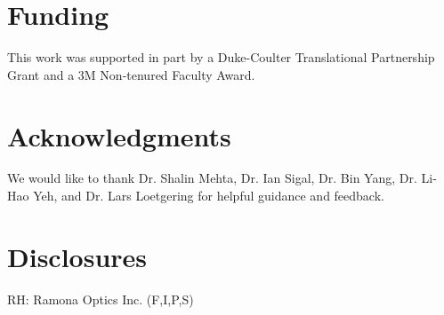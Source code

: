 \documentclass{article}
\begin{document}
 
\section{Funding}
This work was supported in part by a Duke-Coulter Translational Partnership Grant and a 3M Non-tenured Faculty Award.

\section{Acknowledgments}
We would like to thank Dr. Shalin Mehta, Dr. Ian Sigal, Dr. Bin Yang, Dr. Li-Hao Yeh, and Dr. Lars Loetgering for helpful guidance and feedback.

\section{Disclosures}
RH: Ramona Optics Inc. (F,I,P,S)

  



\appendix
\end{document}
